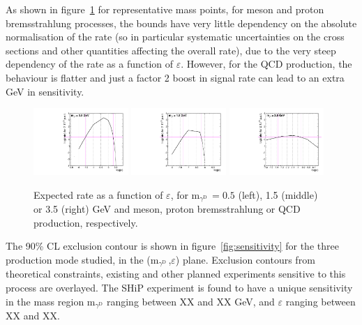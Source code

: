 \documentclass[12pt,a4paper]{article}
\newcommand{\mathDP}{\gamma^{\mathrm{D}}\ }
\newcommand{\mDP}{m$_{\mathDP}$}
\begin{document}
As shown in figure~\ref{fig:ratevseps} for representative mass points,
for meson and proton bremsstrahlung processes, the bounds have very
little dependency on the absolute normalisation of the rate (so in
particular systematic uncertainties on the cross sections and other
quantities affecting the overall rate), due to the very steep
dependency of the rate as a function of $\varepsilon$. However, for
the QCD production, the behaviour is flatter and just a factor 2 boost
in signal rate can lead to an extra GeV in sensitivity.


\begin{figure}[h!]
  \centering
  \includegraphics[width=0.32\textwidth]{figures/CheckRate_hTest_meson_M5.pdf}
  \hfill
  \includegraphics[width=0.32\textwidth]{figures/CheckRate_hTest_pbrem_M15.pdf}
  \hfill
\includegraphics[width=0.32\textwidth]{figures/CheckRate_hTest_qcd_M35.pdf}\\
\caption{Expected rate as a function of $\varepsilon$, for \mDP$=0.5$ (left),
  1.5 (middle) or 3.5 (right) GeV and meson, proton bremsstrahlung or QCD production,
  respectively.}
\label{fig:ratevseps}
\end{figure}


The 90\% CL exclusion contour is shown in figure~\ref{fig:sensitivity}
for the three production mode studied, in the (\mDP,$\varepsilon$)
plane. Exclusion contours from theoretical constraints, existing and
other planned experiments sensitive to this process are overlayed. The
SHiP experiment is found to have a unique sensitivity in the mass
region m$_{\gamma^{\mathrm{D}}}$ ranging between XX and XX GeV, and
$\varepsilon$ ranging between XX and XX.
\end{document}
